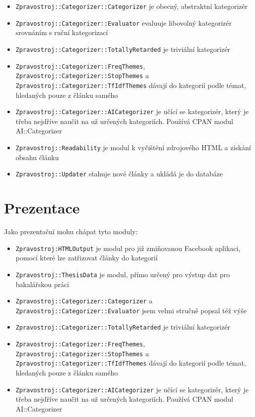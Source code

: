 \documentclass[12pt,a4paper]{report}
\begin{document}
\begin{itemize}
	\item \texttt{Zpravostroj::Categorizer::Categorizer} je obecný, abstraktní kategorizér
	\item \texttt{Zpravostroj::Categorizer::Evaluator} evaluuje libovolný kategorizér srovnáním s ruční kategorizací
	\item \texttt{Zpravostroj::Categorizer::TotallyRetarded} je triviální kategorizér
	\item \texttt{Zpravostroj::Categorizer::FreqThemes}, \texttt{Zpravostroj::Categorizer::StopThemes} a \texttt{Zpravostroj::Categorizer::TfIdfThemes} dávají do kategorií podle témat, hledaných pouze z článku samého
	\item \texttt{Zpravostroj::Categorizer::AICategorizer} je učící se kategorizér, který je třeba nejdříve naučit na už určených kategoriích. Používá CPAN modul AI::Categorizer
	\item \texttt{Zpravostroj::Readability} je modul k vyčištění zdrojového HTML a získání obsahu článku
	\item \texttt{Zpravostroj::Updater} stahuje nové články a ukládá je do databáze
\end{itemize}

\section{Prezentace}
Jako prezentační mohu chápat tyto moduly:
\begin{itemize}
	\item \texttt{Zpravostroj:HTMLOutput} je modul pro již zmiňovanou Facebook aplikaci, pomocí které lze zatřizovat články do kategorií
	\item \texttt{Zpravostroj::ThesisData} je modul, přímo určený pro výstup dat pro bakalářskou práci
	\item \texttt{Zpravostroj::Categorizer::Categorizer} a \texttt{Zpravostroj::Categorizer::Evaluator} jsem velmi stručně popsal též výše
	\item \texttt{Zpravostroj::Categorizer::TotallyRetarded} je triviální kategorizér
	\item \texttt{Zpravostroj::Categorizer::FreqThemes}, \texttt{Zpravostroj::Categorizer::StopThemes} a \texttt{Zpravostroj::Categorizer::TfIdfThemes} dávají do kategorií podle témat, hledaných pouze z článku samého
	\item \texttt{Zpravostroj::Categorizer::AICategorizer} je učící se kategorizér, který je třeba nejdříve naučit na už určených kategoriích. Používá CPAN modul AI::Categorizer
\end{itemize}
\end{document}
